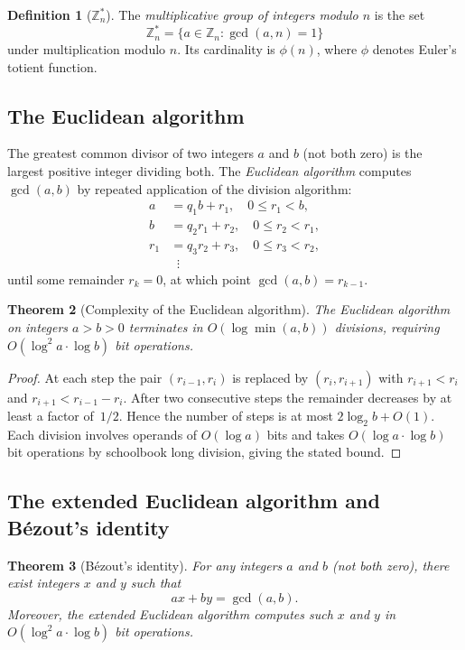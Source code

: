 \documentclass[twoside,12pt]{book}
\theoremstyle{plain}
\newtheorem{theorem}{Theorem}[chapter]
\theoremstyle{definition}
\newtheorem{definition}[theorem]{Definition}
\theoremstyle{remark}
\begin{document}
\begin{definition}[$\mathbb{Z}_n^*$]
The \emph{multiplicative group of integers modulo $n$} is the set
\[
\mathbb{Z}_n^* = \{a \in \mathbb{Z}_n : \gcd(a, n) = 1\}
\]
under multiplication modulo $n$. Its cardinality is $\phi(n)$, where $\phi$ denotes Euler's totient function.
\end{definition}

\subsection{The Euclidean algorithm}

The greatest common divisor of two integers $a$ and $b$ (not both zero) is the largest positive integer dividing both. The \emph{Euclidean algorithm} computes $\gcd(a, b)$ by repeated application of the division algorithm:
\begin{align*}
a &= q_1 b + r_1, \quad 0 \leq r_1 < b, \\
b &= q_2 r_1 + r_2, \quad 0 \leq r_2 < r_1, \\
r_1 &= q_3 r_2 + r_3, \quad 0 \leq r_3 < r_2, \\
&\;\;\vdots
\end{align*}
until some remainder $r_k = 0$, at which point $\gcd(a, b) = r_{k-1}$.

\begin{theorem}[Complexity of the Euclidean algorithm]
\label{thm:euclid}
The Euclidean algorithm on integers $a > b > 0$ terminates in $O(\log \min(a, b))$ divisions, requiring $O(\log^2 a \cdot \log b)$ bit operations.
\end{theorem}

\begin{proof}
At each step the pair $(r_{i-1}, r_i)$ is replaced by $(r_i, r_{i+1})$ with $r_{i+1} < r_i$ and $r_{i+1} < r_{i-1} - r_i$. After two consecutive steps the remainder decreases by at least a factor of~$1/2$. Hence the number of steps is at most $2 \log_2 b + O(1)$. Each division involves operands of $O(\log a)$ bits and takes $O(\log a \cdot \log b)$ bit operations by schoolbook long division, giving the stated bound.
\end{proof}

\subsection{The extended Euclidean algorithm and B\'ezout's identity}

\begin{theorem}[B\'ezout's identity]
\label{thm:bezout}
For any integers $a$ and $b$ (not both zero), there exist integers $x$ and $y$ such that
\[
ax + by = \gcd(a, b).
\]
Moreover, the \emph{extended Euclidean algorithm} computes such $x$ and $y$ in $O(\log^2 a \cdot \log b)$ bit operations.
\end{theorem}
\end{document}
